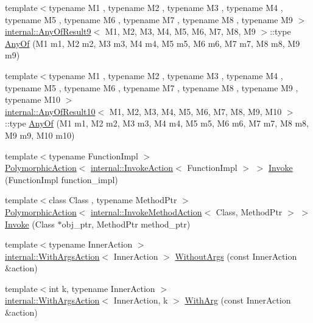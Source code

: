 \begin{DoxyCompactItemize}
\item 
{\footnotesize template$<$typename M1 , typename M2 , typename M3 , typename M4 , typename M5 , typename M6 , typename M7 , typename M8 , typename M9 $>$ }\\\mbox{\hyperlink{structtesting_1_1internal_1_1_any_of_result9}{internal\+::\+Any\+Of\+Result9}}$<$ M1, M2, M3, M4, M5, M6, M7, M8, M9 $>$\+::type \mbox{\hyperlink{namespacetesting_a873c812db953aebd4bf2ffbff0e8d770}{Any\+Of}} (M1 m1, M2 m2, M3 m3, M4 m4, M5 m5, M6 m6, M7 m7, M8 m8, M9 m9)
\item 
{\footnotesize template$<$typename M1 , typename M2 , typename M3 , typename M4 , typename M5 , typename M6 , typename M7 , typename M8 , typename M9 , typename M10 $>$ }\\\mbox{\hyperlink{structtesting_1_1internal_1_1_any_of_result10}{internal\+::\+Any\+Of\+Result10}}$<$ M1, M2, M3, M4, M5, M6, M7, M8, M9, M10 $>$\+::type \mbox{\hyperlink{namespacetesting_a1797921d3ed04c7f13dfa8f36bf0bf1c}{Any\+Of}} (M1 m1, M2 m2, M3 m3, M4 m4, M5 m5, M6 m6, M7 m7, M8 m8, M9 m9, M10 m10)
\item 
{\footnotesize template$<$typename Function\+Impl $>$ }\\\mbox{\hyperlink{classtesting_1_1_polymorphic_action}{Polymorphic\+Action}}$<$ \mbox{\hyperlink{classtesting_1_1internal_1_1_invoke_action}{internal\+::\+Invoke\+Action}}$<$ Function\+Impl $>$ $>$ \mbox{\hyperlink{namespacetesting_a12aebaf8363d49a383047529f798b694}{Invoke}} (Function\+Impl function\+\_\+impl)
\item 
{\footnotesize template$<$class Class , typename Method\+Ptr $>$ }\\\mbox{\hyperlink{classtesting_1_1_polymorphic_action}{Polymorphic\+Action}}$<$ \mbox{\hyperlink{structtesting_1_1internal_1_1_invoke_method_action}{internal\+::\+Invoke\+Method\+Action}}$<$ Class, Method\+Ptr $>$ $>$ \mbox{\hyperlink{namespacetesting_a80b82dc382445d240ff011f9c34aefc4}{Invoke}} (Class $\ast$obj\+\_\+ptr, Method\+Ptr method\+\_\+ptr)
\item 
{\footnotesize template$<$typename Inner\+Action $>$ }\\\mbox{\hyperlink{structtesting_1_1internal_1_1_with_args_action}{internal\+::\+With\+Args\+Action}}$<$ Inner\+Action $>$ \mbox{\hyperlink{namespacetesting_aeac85f74bd11112f69142e92e3a50780}{Without\+Args}} (const Inner\+Action \&action)
\item 
{\footnotesize template$<$int k, typename Inner\+Action $>$ }\\\mbox{\hyperlink{structtesting_1_1internal_1_1_with_args_action}{internal\+::\+With\+Args\+Action}}$<$ Inner\+Action, k $>$ \mbox{\hyperlink{namespacetesting_af76590c6cecc621e1ab4b681a9ea209b}{With\+Arg}} (const Inner\+Action \&action)

\end{DoxyCompactItemize}
